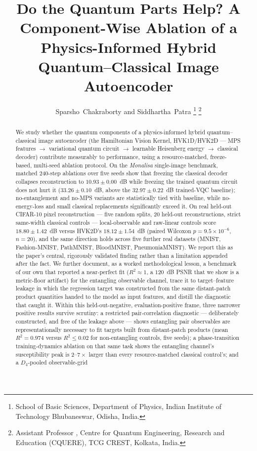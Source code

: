 \documentclass[journal]{IEEEtran}
\begin{document}
\title{Do the Quantum Parts Help? A Component-Wise Ablation of a Physics-Informed Hybrid Quantum--Classical Image Autoencoder}

\author{Sparsho~Chakraborty and Siddhartha~Patra%
\thanks{School of Basic Sciences, Department of Physics, Indian Institute of Technology Bhubaneswar, Odisha, India.}%
\thanks{ Assistant Professor , Centre for Quantum Engineering, Research and Education (CQUERE), TCG CREST, Kolkata, India.}}

\maketitle

\begin{abstract}
We study whether the quantum components of a physics-informed hybrid quantum--classical image autoencoder (the Hamiltonian Vision Kernel, HVK1D/HVK2D --- MPS features $\to$ variational quantum circuit $\to$ learnable Heisenberg energy $\to$ classical decoder) contribute measurably to performance, using a resource-matched, freeze-based, multi-seed ablation protocol. On the \textit{Monalisa} single-image benchmark, matched 240-step ablations over five seeds show that freezing the classical decoder collapses reconstruction to $10.93\pm0.00$~dB while freezing the trained quantum circuit does not hurt it ($33.26\pm0.10$~dB, above the $32.97\pm0.22$~dB trained-VQC baseline); no-entanglement and no-MPS variants are statistically tied with baseline, while no-energy-loss and small classical replacements significantly exceed it. On real held-out CIFAR-10 pixel reconstruction --- five random splits, 20 held-out reconstructions, strict same-width classical controls --- local-observable and raw-linear controls score $18.80\pm1.42$~dB versus HVK2D's $18.12\pm1.54$~dB (paired Wilcoxon $p=9.5\times10^{-6}$, $n=20$), and the same direction holds across five further real datasets (MNIST, Fashion-MNIST, PathMNIST, BloodMNIST, PneumoniaMNIST). We report this as the paper's central, rigorously validated finding rather than a limitation appended after the fact. We further document, as a worked methodological lesson, a benchmark of our own that reported a near-perfect fit ($R^2\approx1$, a $120$~dB PSNR that we show is a metric-floor artifact) for the entangling observable channel, trace it to target--feature leakage in which the regression target was constructed from the same distant-patch product quantities handed to the model as input features, and distill the diagnostic that caught it. Within this held-out-negative, evaluation-positive frame, three narrower positive results survive scrutiny: a restricted pair-correlation diagnostic --- deliberately constructed, and free of the leakage above --- shows entangling pair observables are representationally necessary to fit targets built from distant-patch products (mean $R^2=0.974$ versus $R^2\leq0.02$ for non-entangling controls, five seeds); a phase-transition training-dynamics ablation on that same task shows the entangling channel's susceptibility peak is $2$--$7\times$ larger than every resource-matched classical control's; and a $D_4$-pooled observable-grid 
\end{abstract}
\end{document}
